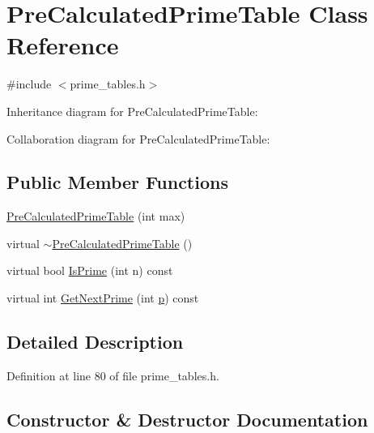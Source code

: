 \hypertarget{class_pre_calculated_prime_table}{}\section{Pre\+Calculated\+Prime\+Table Class Reference}
\label{class_pre_calculated_prime_table}


{\ttfamily \#include $<$prime\+\_\+tables.\+h$>$}



Inheritance diagram for Pre\+Calculated\+Prime\+Table\+:


Collaboration diagram for Pre\+Calculated\+Prime\+Table\+:
\subsection*{Public Member Functions}
\begin{DoxyCompactItemize}
\item 
\hyperlink{class_pre_calculated_prime_table_a6bb947504421e31da70d2c71576be350}{Pre\+Calculated\+Prime\+Table} (int max)
\item 
virtual \hyperlink{class_pre_calculated_prime_table_a6ceab295f80dbe2766b8d4f54138bbc4}{$\sim$\+Pre\+Calculated\+Prime\+Table} ()
\item 
virtual bool \hyperlink{class_pre_calculated_prime_table_ae3d0da99f18f4b57d8d63ecebfd65106}{Is\+Prime} (int n) const 
\item 
virtual int \hyperlink{class_pre_calculated_prime_table_a405c77ebe22cd11d7782ea264502ed39}{Get\+Next\+Prime} (int \hyperlink{jquery_8js_a2335e57f79b6acfb6de59c235dc8a83e}{p}) const 
\end{DoxyCompactItemize}


\subsection{Detailed Description}


Definition at line 80 of file prime\+\_\+tables.\+h.



\subsection{Constructor \& Destructor Documentation}
